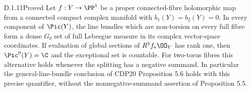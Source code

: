
\begin{idstatement}{D.1.11}{Proved}\label{st:D.1.11}
Let $f:Y\to\PP^1$ be a proper connected-fibre holomorphic map from
a connected compact complex manifold with $b_1(Y)=b_2(Y)=0$.
In every component of $\Pic(Y)$, the line
bundles which are non-torsion on every full fibre form a dense
$G_\delta$ set of full Lebesgue measure in its complex vector-space
coordinates. If evaluation of global sections of $R^1f_*\OO_Y$
has rank one, then $\Pic^0(Y)=\C$ and the exceptional set is
countable. For two-torus fibres this alternative holds whenever
the splitting has a negative summand.
In particular the general-line-bundle conclusion of CDP20
Proposition 5.6 holds with this precise quantifier, without the
nonnegative-summand assertion of Proposition 5.5.
\end{idstatement}

